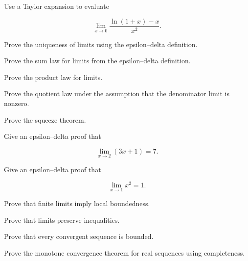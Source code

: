 \begin{exercise}[3]
Use a Taylor expansion to evaluate

\[
\lim_{x\to0}
\frac{
\ln(1+x)-x
}{
x^2
}.
\]
\end{exercise}

\begin{exercise}[4]
Prove the uniqueness of limits using the epsilon--delta definition.
\end{exercise}

\begin{exercise}[4]
Prove the sum law for limits from the epsilon--delta definition.
\end{exercise}

\begin{exercise}[4]
Prove the product law for limits.
\end{exercise}

\begin{exercise}[4]
Prove the quotient law under the assumption that the denominator limit is
nonzero.
\end{exercise}

\begin{exercise}[4]
Prove the squeeze theorem.
\end{exercise}

\begin{exercise}[4]
Give an epsilon--delta proof that

\[
\lim_{x\to2}
(3x+1)
=
7.
\]
\end{exercise}

\begin{exercise}[4]
Give an epsilon--delta proof that

\[
\lim_{x\to1}
x^2
=
1.
\]
\end{exercise}

\begin{exercise}[4]
Prove that finite limits imply local boundedness.
\end{exercise}

\begin{exercise}[4]
Prove that limits preserve inequalities.
\end{exercise}

\begin{exercise}[4]
Prove that every convergent sequence is bounded.
\end{exercise}

\begin{exercise}[4]
Prove the monotone convergence theorem for real sequences using completeness.
\end{exercise}

